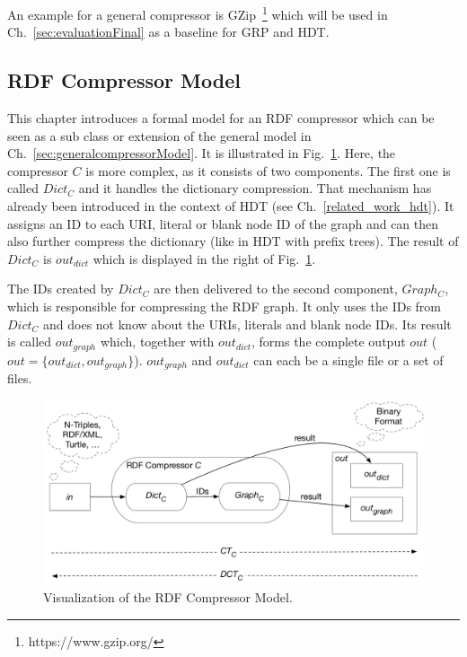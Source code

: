 An example for a general compressor is GZip~\footnote{https://www.gzip.org/} which will be used in Ch.~\ref{sec:evaluationFinal} as a baseline for GRP and HDT.

\subsection{RDF Compressor Model}\label{sec:compressorModel}

This chapter introduces a formal model for an RDF compressor which can be seen as a sub class or extension of the general model in Ch.~\ref{sec:generalcompressorModel}. It is illustrated in Fig.~\ref{fig:compressorModel}. Here, the compressor $C$ is more complex, as it consists of two components. The first one is called $Dict_C$ and it handles the dictionary compression. That mechanism has already been introduced in the context of HDT (see Ch.~\ref{related_work_hdt}). It assigns an ID to each URI, literal or blank node ID of the graph and can then also further compress the dictionary (like in HDT with prefix trees). The result of $Dict_C$ is $out_{dict}$ which is displayed in the right of Fig.~\ref{fig:compressorModel}. 

The IDs created by $Dict_C$ are then delivered to the second component, $Graph_C$, which is responsible for compressing the RDF graph. It only uses the IDs from $Dict_C$ and does not know about the URIs, literals and blank node IDs. Its result is called $out_{graph}$ which, together with $out_{dict}$, forms the complete output $out$ ($out=\{out_{dict}, out_{graph}\} $). $out_{graph}$ and $out_{dict}$ can each be a single file or a set of files. 

\begin{figure}
	\centering
	\includegraphics[width=\linewidth]{figures/approach/model}
	\caption{Visualization of the RDF Compressor Model.}
	\label{fig:compressorModel}
\end{figure}


